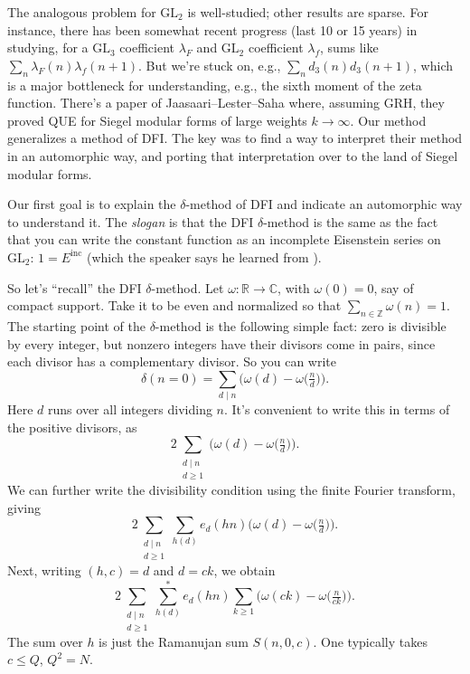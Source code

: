 \documentclass[reqno]{amsart} 
\begin{document}
The analogous problem for $\mathrm{GL}_2$ is well-studied; other results are sparse.  For instance, there has been somewhat recent progress (last 10 or 15 years) in studying, for a $\mathrm{GL}_3$ coefficient $\lambda_F$ and $\mathrm{GL}_2$ coefficient $\lambda_f$, sums like $\sum_n \lambda_F(n) \lambda_f(n + 1)$.  But we're stuck on, e.g., $\sum_n d_3(n) d_3(n + 1)$, which is a major bottleneck for understanding, e.g., the sixth moment of the zeta function.  There's a paper of Jaasaari--Lester--Saha where, assuming GRH, they proved QUE for Siegel modular forms of large weights $k \rightarrow \infty$.  Our method generalizes a method of DFI.  The key was to find a way to interpret their method in an automorphic way, and porting that interpretation over to the land of Siegel modular forms.

Our first goal is to explain the $\delta$-method of DFI and indicate an automorphic way to understand it.  The \emph{slogan} is that the DFI $\delta$-method is the same as the fact that you can write the constant function as an incomplete Eisenstein series on $\mathrm{GL}_2$: $1 = E^{\mathrm{inc}}$ (which the speaker says he learned from \cite{2012arXiv1210.1243N}).

So let's ``recall'' the DFI $\delta$-method.  Let $\omega : \mathbb{R} \rightarrow \mathbb{C}$, with $\omega(0) = 0$, say of compact support.  Take it to be even and normalized so that $\sum_{n \in \mathbb{Z}} \omega(n) = 1$.  The starting point of the $\delta$-method is the following simple fact: zero is divisible by every integer, but nonzero integers have their divisors come in pairs, since each divisor has a complementary divisor.  So you can write
\begin{equation*}
  \delta(n = 0) = \sum_{d \mid n} \bigl( \omega(d) - \omega\bigl(\tfrac{n}{d}\bigr) \bigr).
\end{equation*}
Here $d$ runs over all integers dividing $n$.  It's convenient to write this in terms of the positive divisors, as
\begin{equation*}
  2 \sum_{
    \substack{
      d \mid n  \\
      d \geq 1      
    }
  }
  \bigl( \omega(d) - \omega\bigl(\tfrac{n}{d}\bigr) \bigr).
\end{equation*}
We can further write the divisibility condition using the finite Fourier transform, giving
\begin{equation*}
  2 \sum_{
    \substack{
      d \mid n  \\
      d \geq 1      
    }
  }
  \sum_{h(d)}
  e_d(h n)
  \bigl( \omega(d) - \omega\bigl(\tfrac{n}{d}\bigr) \bigr).
\end{equation*}
Next, writing $(h, c) = d$ and $d = c k$, we obtain
\begin{equation*}
  2 \sum_{
    \substack{
      d \mid n  \\
      d \geq 1      
    }
  }
  \sum_{h(d)}^\ast
  e_d(h n)
  \sum_{k \geq 1}
  \bigl( \omega(c k) - \omega\bigl(\tfrac{n}{c k}\bigr) \bigr).
\end{equation*}
The sum over $h$ is just the Ramanujan sum $S(n, 0, c)$.  One typically takes $c \leq Q$, $Q^2 = N$.
\end{document}
